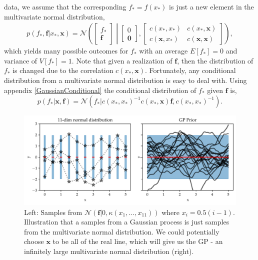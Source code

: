    data, we assume that the corresponding $f_* = f(x_*)$ is just a new element in the multivariate
    normal distribution, 
\begin{align}\label{prior_gp}
    p(f_*,\textbf{f}|x_*,\textbf{x}) = \mathcal{N}\left(\begin{bmatrix}
        f_*\\ \textbf{f}
    \end{bmatrix} \middle| \begin{bmatrix}
        0\\ \textbf{0}
    \end{bmatrix}, \begin{bmatrix}
        c(x_*, x_*) & c(x_*,\textbf{x})\\
        c(\textbf{x}, x_*) & c(\textbf{x}, \textbf{x})
    \end{bmatrix} \right), 
\end{align}
which yields many possible outcomes for $f_*$ with an average $E[f_*] = 0$ and variance of $V[f_*] =
1$. Note that given a realization of $\textbf{f}$, then the distribution of $f_*$ is changed due to
the correlation $c(x_*, \textbf{x})$. Fortunately, any conditional distribution from a multivariate
normal distribution is easy to deal with. Using appendix \ref{GaussianConditional} the
conditional distribution of $f_*$ given $\textbf{f}$ is, 
\begin{equation} \label{conditional_GP}
    p(f_*|\textbf{x}, \textbf{f}) = \mathcal{N}(f_*|c(x_*, x_*)^{-1}c(x_*, \textbf{x})\textbf{f},c(x_*, x_*)^{-1}).
\end{equation}
\begin{figure}
    \centering
    \includegraphics[width = \textwidth]{Pictures/GP_samples_mattern.pdf}
    \caption{Left: Samples from $\mathcal{N}(\textbf{f}|0,\kappa(x_1,\dots, x_{11}))$ where
    $x_i= 0.5(i-1)$. Illustration that a samples from a Gaussian process is just
    samples from the multivariate normal distribution. We could potentially choose
    $\textbf{x}$ to be all of the real line, which will give us the GP - an infinitely
    large multivariate normal distribution (right).}
    \label{GP_illustration}
\end{figure}


